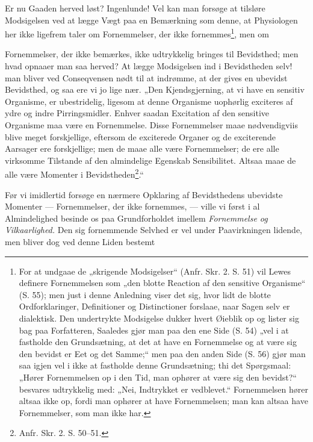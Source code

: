 \documentclass[12pt,a4paper]{book}
\begin{document}
Er nu Gaaden herved løst? Ingenlunde! Vel kan man forsøge at tilsløre
Modsigelsen ved at lægge Vægt paa en Bemærkning som denne, at Physiologen her
ikke ligefrem taler om Fornemmelser, der ikke fornemmes\footnote{For at undgaae
de „skrigende Modsigelser“ (Anfr. Skr. 2. S. 51) vil Lewes definere
Fornemmelsen som „den blotte Reaction af den sensitive Organisme“ (S. 55); men
just i denne Anledning viser det
sig, hvor lidt de blotte Ordforklaringer, Definitioner og Distinctioner
forslaae, naar Sagen selv er dialektisk. Den undertrykte Modsigelse dukker
hvert Øieblik op og lister sig bag paa Forfatteren, Saaledes gjør man paa den
ene Side (S. 54) „vel i at fastholde den Grundsætning, at det at have en
Fornemmelse og at være sig den bevidst er Eet og det Samme;“ men paa den anden
Side (S. 56) gjør man saa igjen vel i ikke at fastholde denne Grundsætning; thi
det Spørgsmaal: „Hører Fornemmelsen op i den Tid, man ophører at være sig den
bevidst?“ besvares udtrykkelig med: „Nei, Indtrykket er vedblevet.“
Fornemmelsen hører altsaa ikke op, fordi man ophører at have Fornemmelsen; man
kan altsaa have Fornemmelser, som man ikke har.}, men om

\setcounter{footnote}{0}
Fornemmelser, der ikke bemærkes, ikke udtrykkelig bringes til Bevidsthed; men
hvad opnaaer man saa herved? At lægge Modsigelsen ind i Bevidstheden selv! man
bliver ved Conseqvensen nødt til at indrømme, at der gives en ubevidst
Bevidsthed, og saa ere vi jo lige nær. „Den Kjendsgjerning, at vi have en
sensitiv Organisme, er ubestridelig, ligesom at denne Organisme uophørlig
exciteres af ydre og indre Pirringsmidler. Enhver saadan Excitation af den
sensitive Organisme maa være en Fornemmelse. Disse Fornemmelser maae
nødvendigviis blive meget forskjellige, eftersom de exciterede Organer og de
exciterende Aarsager ere forskjellige; men de maae alle være Fornemmelser; de
ere alle virksomme Tilstande af den almindelige Egenskab Sensibilitet. Altsaa
maae de alle være Momenter i Bevidstheden\footnote{Anfr. Skr. 2. S. 50--51.}.“

Før vi imidlertid forsøge en nærmere Opklaring af Bevidsthedens ubevidste
Momenter --- Fornemmelser, der ikke fornemmes, --- ville vi først i al
Almindelighed besinde os paa Grundforholdet imellem \emph{Fornemmelse og
Vilkaarlighed.} Den sig fornemmende Selvhed er vel under Paavirkningen lidende,
men bliver dog ved denne Liden bestemt
\end{document}
